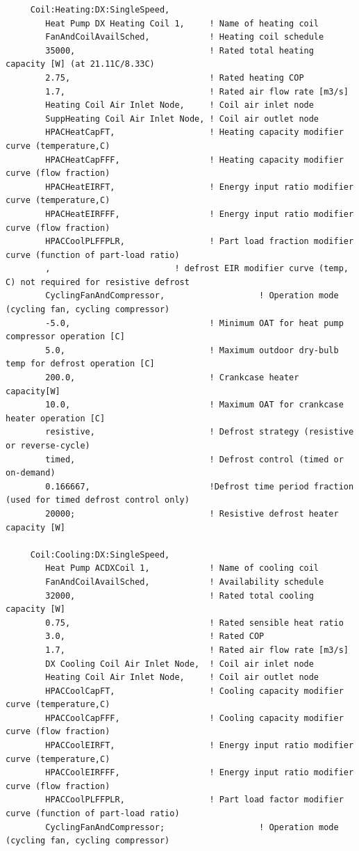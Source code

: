 \begin{lstlisting}
     Coil:Heating:DX:SingleSpeed,
        Heat Pump DX Heating Coil 1,     ! Name of heating coil
        FanAndCoilAvailSched,            ! Heating coil schedule
        35000,                           ! Rated total heating capacity [W] (at 21.11C/8.33C)
        2.75,                            ! Rated heating COP
        1.7,                             ! Rated air flow rate [m3/s]
        Heating Coil Air Inlet Node,     ! Coil air inlet node
        SuppHeating Coil Air Inlet Node, ! Coil air outlet node
        HPACHeatCapFT,                   ! Heating capacity modifier curve (temperature,C)
        HPACHeatCapFFF,                  ! Heating capacity modifier curve (flow fraction)
        HPACHeatEIRFT,                   ! Energy input ratio modifier curve (temperature,C)
        HPACHeatEIRFFF,                  ! Energy input ratio modifier curve (flow fraction)
        HPACCoolPLFFPLR,                 ! Part load fraction modifier curve (function of part-load ratio)
        ,                         ! defrost EIR modifier curve (temp, C) not required for resistive defrost
        CyclingFanAndCompressor,                   ! Operation mode (cycling fan, cycling compressor)
        -5.0,                            ! Minimum OAT for heat pump compressor operation [C]
        5.0,                             ! Maximum outdoor dry-bulb temp for defrost operation [C]
        200.0,                           ! Crankcase heater capacity[W]
        10.0,                            ! Maximum OAT for crankcase heater operation [C]
        resistive,                       ! Defrost strategy (resistive or reverse-cycle)
        timed,                           ! Defrost control (timed or on-demand)
        0.166667,                        !Defrost time period fraction (used for timed defrost control only)
        20000;                           ! Resistive defrost heater capacity [W]

     Coil:Cooling:DX:SingleSpeed,
        Heat Pump ACDXCoil 1,            ! Name of cooling coil
        FanAndCoilAvailSched,            ! Availability schedule
        32000,                           ! Rated total cooling capacity [W]
        0.75,                            ! Rated sensible heat ratio
        3.0,                             ! Rated COP
        1.7,                             ! Rated air flow rate [m3/s]
        DX Cooling Coil Air Inlet Node,  ! Coil air inlet node
        Heating Coil Air Inlet Node,     ! Coil air outlet node
        HPACCoolCapFT,                   ! Cooling capacity modifier curve (temperature,C)
        HPACCoolCapFFF,                  ! Cooling capacity modifier curve (flow fraction)
        HPACCoolEIRFT,                   ! Energy input ratio modifier curve (temperature,C)
        HPACCoolEIRFFF,                  ! Energy input ratio modifier curve (flow fraction)
        HPACCoolPLFFPLR,                 ! Part load factor modifier curve (function of part-load ratio)
        CyclingFanAndCompressor;                   ! Operation mode (cycling fan, cycling compressor)


\end{lstlisting}
